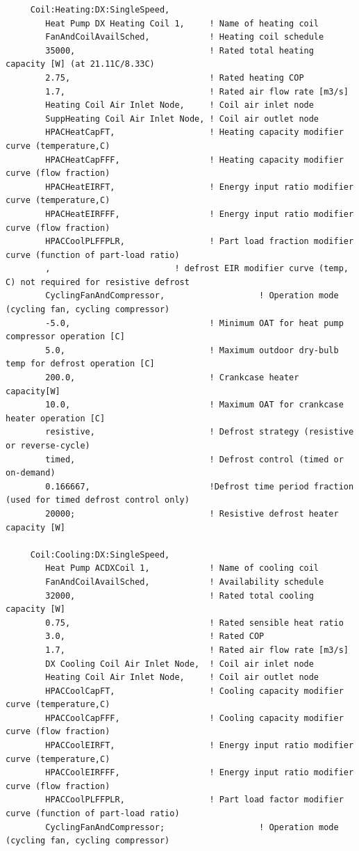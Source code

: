 \begin{lstlisting}
     Coil:Heating:DX:SingleSpeed,
        Heat Pump DX Heating Coil 1,     ! Name of heating coil
        FanAndCoilAvailSched,            ! Heating coil schedule
        35000,                           ! Rated total heating capacity [W] (at 21.11C/8.33C)
        2.75,                            ! Rated heating COP
        1.7,                             ! Rated air flow rate [m3/s]
        Heating Coil Air Inlet Node,     ! Coil air inlet node
        SuppHeating Coil Air Inlet Node, ! Coil air outlet node
        HPACHeatCapFT,                   ! Heating capacity modifier curve (temperature,C)
        HPACHeatCapFFF,                  ! Heating capacity modifier curve (flow fraction)
        HPACHeatEIRFT,                   ! Energy input ratio modifier curve (temperature,C)
        HPACHeatEIRFFF,                  ! Energy input ratio modifier curve (flow fraction)
        HPACCoolPLFFPLR,                 ! Part load fraction modifier curve (function of part-load ratio)
        ,                         ! defrost EIR modifier curve (temp, C) not required for resistive defrost
        CyclingFanAndCompressor,                   ! Operation mode (cycling fan, cycling compressor)
        -5.0,                            ! Minimum OAT for heat pump compressor operation [C]
        5.0,                             ! Maximum outdoor dry-bulb temp for defrost operation [C]
        200.0,                           ! Crankcase heater capacity[W]
        10.0,                            ! Maximum OAT for crankcase heater operation [C]
        resistive,                       ! Defrost strategy (resistive or reverse-cycle)
        timed,                           ! Defrost control (timed or on-demand)
        0.166667,                        !Defrost time period fraction (used for timed defrost control only)
        20000;                           ! Resistive defrost heater capacity [W]

     Coil:Cooling:DX:SingleSpeed,
        Heat Pump ACDXCoil 1,            ! Name of cooling coil
        FanAndCoilAvailSched,            ! Availability schedule
        32000,                           ! Rated total cooling capacity [W]
        0.75,                            ! Rated sensible heat ratio
        3.0,                             ! Rated COP
        1.7,                             ! Rated air flow rate [m3/s]
        DX Cooling Coil Air Inlet Node,  ! Coil air inlet node
        Heating Coil Air Inlet Node,     ! Coil air outlet node
        HPACCoolCapFT,                   ! Cooling capacity modifier curve (temperature,C)
        HPACCoolCapFFF,                  ! Cooling capacity modifier curve (flow fraction)
        HPACCoolEIRFT,                   ! Energy input ratio modifier curve (temperature,C)
        HPACCoolEIRFFF,                  ! Energy input ratio modifier curve (flow fraction)
        HPACCoolPLFFPLR,                 ! Part load factor modifier curve (function of part-load ratio)
        CyclingFanAndCompressor;                   ! Operation mode (cycling fan, cycling compressor)


\end{lstlisting}
